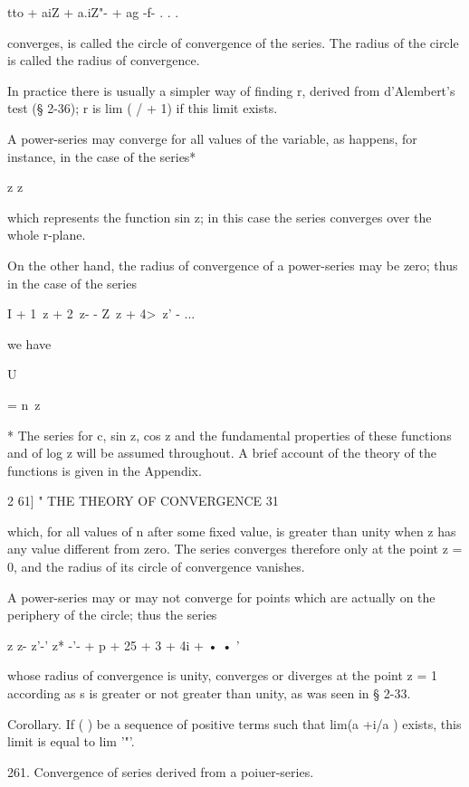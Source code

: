 tto + aiZ + a.iZ"- + ag -f- . . .

converges, is called the circle of convergence of the series. The
radius of the circle is called the radius of convergence.

In practice there is usually a simpler way of finding r, derived from
d'Alembert's test (§ 2-36); r is lim ( / + 1) if this limit exists.

A power-series may converge for all values of the variable, as
happens, for instance, in the case of the series*

z z

which represents the function sin z; in this case the series
converges over the whole r-plane.

On the other hand, the radius of convergence of a power-series may be
zero; thus in the case of the series

I + 1\ z + 2\ z- - Z\ z + 4>\ z' - ...



we have



U



= n\ z



* The series for c, sin z, cos z and the fundamental properties of
these functions and of log z will be assumed throughout. A brief
account of the theory of the functions is given in the Appendix.



2 61] " THE THEORY OF CONVERGENCE 31

which, for all values of n after some fixed value, is greater than
unity when z has any value different from zero. The series converges
therefore only at the point z = 0, and the radius of its circle of
convergence vanishes.

A power-series may or may not converge for points which are actually
on the periphery of the circle; thus the series

z z- z'-' z* -'- + p + 25 + 3 + 4i + • • '

whose radius of convergence is unity, converges or diverges at the
point z = 1 according as s is greater or not greater than unity, as
was seen in § 2-33.

Corollary. If ( ) be a sequence of positive terms such that lim(a +i/a
) exists, this limit is equal to lim '"'.

261. Convergence of series derived from a poiuer-series.

